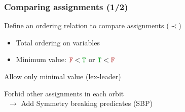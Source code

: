 \documentclass{beamer}
\begin{document}
\begin{frame}
	\frametitle{Comparing assignments (1/2)}
	
	Define an ordering relation to compare assignments ($\prec$)
	\begin{itemize}
		\item Total ordering on variables
		\item Minimum value: $\false < \true$ or $\true < \false$
	\end{itemize}
\vfill
	\begin{center}
			Allow only minimal value (lex-leader)\\
	\end{center}
	\vfill
	Forbid other assignments in each orbit\\
	\vfill
	$\enspace \rightarrow$ Add Symmetry breaking predicates (SBP)
	


\end{frame}
\end{document}
